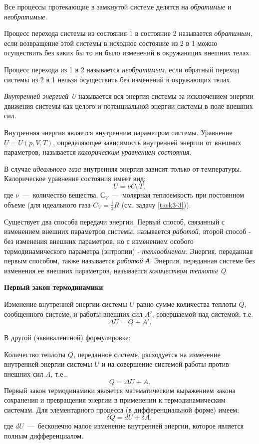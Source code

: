 Все процессы протекающие в замкнутой системе делятся на \emph{обратимые}
и \emph{необратимые}.

Процесс перехода системы из состояния 1 в состояние 2 называется
\emph{обратимым}, если возвращение этой системы в исходное состояние из
2 в 1 можно осуществить без каких бы то ни было изменений в окружающих
внешних телах.

Процесс перехода из 1 в 2 называется \emph{необратимым}, если обратный
переход системы из 2 в 1 нельзя осуществить без изменений в окружающих
телах.

\emph{Внутренней энергией U} называется вся энергия системы за
исключением энергии движения системы как целого и потенциальной энергии
системы в поле внешних сил.

Внутренняя энергия является внутренним параметром системы. Уравнение
$U = U (p, V, T)$, определяющее зависимость внутренней энергии от
внешних параметров, называется \emph{калорическим уравнением состояния}.

В случае \emph{идеального газа} внутренняя энергия зависит только от
температуры. Калорическое уравнение состояния имеет вид:
\begin{equation}
  U = \nu C_V T,
\end{equation}
где $ν$~---~количество вещества, 
$С_V$~---~молярная теплоемкость при постоянном объеме (для идеального газа $C_V = \frac{i}{2}R$ (см. задачу \ref{task3-3})).

Существует два способа передачи энергии. Первый способ, связанный с
изменением внешних параметров системы, называется \emph{работой,} второй
способ - без изменения внешних параметров, но с изменением особого
термодинамического параметра (энтропии) - \emph{теплообменом}. Энергия,
переданная первым способом, также называется \emph{работой А.} Энергия,
переданная системе без изменения ее внешних параметров, называется
\emph{количеством теплоты Q.}
\begin{center}
  \textbf{Первый закон термодинамики}
\end{center}

Изменение внутренней энергии системы $U$ равно сумме количества
теплоты $Q$, сообщенного системе, и работы внешних сил $A'$,
совершаемой над системой, т.е. 
\begin{equation}
  \Delta U = Q + A'.
\end{equation}

В другой (эквивалентной) формулировке:

Количество теплоты $Q$, переданное системе, расходуется на
изменение внутренней энергии системы $U$ и на совершение системой
работы против внешних сил $A$, т.е.. 
\begin{equation}
  Q = \Delta U + A.
\end{equation}
Первый закон термодинамики является математическим выражением закона
сохранения и превращения энергии в применении к термодинамическим
системам. Для элементарного процесса (в дифференциальной форме) имеем:
\begin{equation}
  δQ = dU + δA,
\end{equation}
где $dU$~---~бесконечно малое изменение внутренней энергии, которое
является полным дифференциалом.

